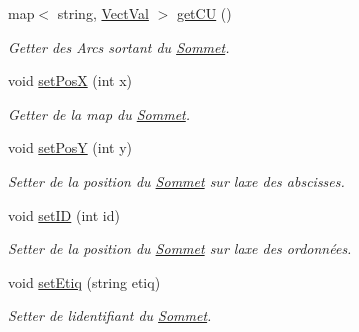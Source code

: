 \begin{DoxyCompactItemize}
\mbox{\label{classSommet_af87d5dc7e5dc2ca47819a306863f9b09}} 
map$<$ string, \hyperlink{structVectVal}{Vect\+Val} $>$ \hyperlink{classSommet_af87d5dc7e5dc2ca47819a306863f9b09}{get\+CU} ()
\begin{DoxyCompactList}\small\item\em Getter des Arcs sortant du \hyperlink{classSommet}{Sommet}. \end{DoxyCompactList}\item 
\mbox{\label{classSommet_abeddc30829ecda90fde00dfb230850c2}} 
void \hyperlink{classSommet_abeddc30829ecda90fde00dfb230850c2}{set\+PosX} (int x)
\begin{DoxyCompactList}\small\item\em Getter de la map du \hyperlink{classSommet}{Sommet}. \end{DoxyCompactList}\item 
\mbox{\label{classSommet_af107d9f68101eb5194827191032e66ec}} 
void \hyperlink{classSommet_af107d9f68101eb5194827191032e66ec}{set\+PosY} (int y)
\begin{DoxyCompactList}\small\item\em Setter de la position du \hyperlink{classSommet}{Sommet} sur l\textquotesingle{}axe des abscisses. \end{DoxyCompactList}\item 
\mbox{\label{classSommet_a9a63bd9ea3040add6b61c04f9b2fdff0}} 
void \hyperlink{classSommet_a9a63bd9ea3040add6b61c04f9b2fdff0}{set\+ID} (int id)
\begin{DoxyCompactList}\small\item\em Setter de la position du \hyperlink{classSommet}{Sommet} sur l\textquotesingle{}axe des ordonn\'{e}es. \end{DoxyCompactList}\item 
\mbox{\label{classSommet_a5aaff5088496a65f0833c8b8d005e00e}} 
void \hyperlink{classSommet_a5aaff5088496a65f0833c8b8d005e00e}{set\+Etiq} (string etiq)
\begin{DoxyCompactList}\small\item\em Setter de l\textquotesingle{}identifiant du \hyperlink{classSommet}{Sommet}. \end{DoxyCompactList}\item 
\mbox{\label{classSommet_acfb1d54c68ae9dd484efdf129e5bd237}} 

\end{DoxyCompactItemize}
